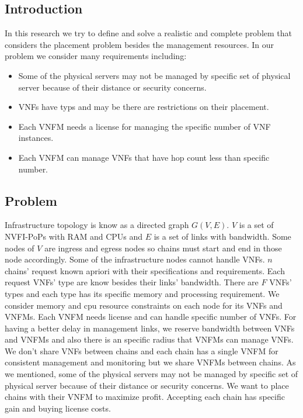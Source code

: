 \subsection{Introduction}
\par
In this research we try to define and solve a realistic and complete problem that considers the placement problem besides the management resources.
In our problem we consider many requirements including:

\begin{itemize}
    \item Some of the physical servers may not be managed by specific set of physical server because of their distance or security concerns.
    \item VNFs have typs and may be there are restrictions on their placement.
    \item Each VNFM needs a license for managing the specific number of VNF instances.
    \item Each VNFM can manage VNFs that have hop count less than specific number.
\end{itemize}

\subsection{Problem}
\par
Infrastructure topology is know as a directed graph \(G(V, E)\). \(V\) is a set of NVFI-PoPs with RAM and CPUs and \(E\) is a set of links with bandwidth.
Some nodes of \(V\) are ingress and egress nodes so chains must start and end in those node accordingly. Some of the infrastructure nodes cannot handle VNFs.
\(n\) chains' request known apriori with their specifications and requirements. Each request VNFs' type are know besides their links' bandwidth.
There are \(F\) VNFs' types and each type has its specific memory and processing requirement.
We consider memory and cpu resource constraints on each node for its VNFs and VNFMs.
Each VNFM needs license and can handle specific number of VNFs.
For having a better delay in management links, we reserve bandwidth between VNFs and VNFMs and also there is an specific radius that VNFMs can manage VNFs.
We don't share VNFs between chains and each chain has a single VNFM for consistent management and monitoring but we share VNFMs between chains.
As we mentioned, some of the physical servers may not be managed by specific set of physical server because of their distance or security concerns.
We want to place chains with their VNFM to maximize profit. Accepting each chain has specific gain and buying license costs.

